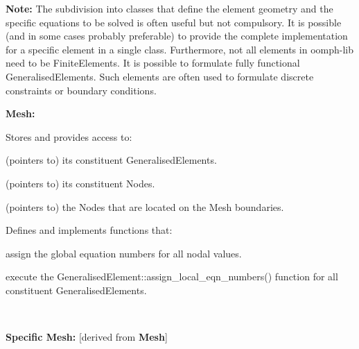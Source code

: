 {\bfseries Note\-:} The subdivision into classes that define the element geometry and the specific equations to be solved is often useful but not compulsory. It is possible (and in some cases probably preferable) to provide the complete implementation for a specific element in a single class. Furthermore, not all elements in {\ttfamily oomph-\/lib} need to be {\ttfamily Finite\-Elements}. It is possible to formulate fully functional Generalised\-Elements. Such elements are often used to formulate discrete constraints or boundary conditions.

\begin{center} \begin{TabularC}{1}
\hline
\begin{center} \begin{TabularC}{1}
\hline
\begin{center} {\bfseries Mesh\-:} \end{center} 
\begin{DoxyItemize}
\item Stores and provides access to\-:
\begin{DoxyItemize}
\item (pointers to) its constituent {\ttfamily Generalised\-Elements}.
\item (pointers to) its constituent {\ttfamily Nodes}.
\item (pointers to) the {\ttfamily Nodes} that are located on the {\ttfamily Mesh} boundaries.
\end{DoxyItemize}
\item Defines and implements functions that\-:
\begin{DoxyItemize}
\item assign the global equation numbers for all nodal values.
\item execute the {\ttfamily Generalised\-Element\-::assign\-\_\-local\-\_\-eqn\-\_\-numbers()} function for all constituent Generalised\-Elements.   
\end{DoxyItemize}
\end{DoxyItemize}\\
\end{TabularC}
\end{center}  \begin{center} \begin{TabularC}{1}
\hline
\begin{center} {\bfseries Specific Mesh\-:} \newline
\mbox{[}derived from {\bfseries Mesh}\mbox{]} \end{center} 

\end{TabularC}
\end{center}
\end{TabularC}
\end{center}
